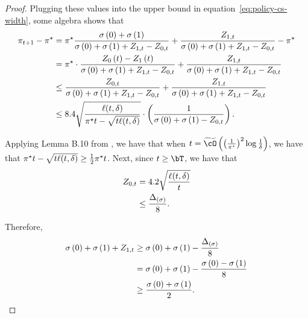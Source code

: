 \begin{proof}
        Plugging these values into the upper bound in equation~\eqref{eq:policy-cs-width}, some algebra shows that
        \begin{align}
            \policy_{\round + 1} - \neymanPolicy 
                &= \neymanPolicy\frac{\stdev[\cidx] + \stdev[\tidx]}
                        {\stdev[\cidx] + \stdev[\tidx] + \confWidth_{\tidx, \round} - \confWidth_{\cidx, \round}}
                    + \frac{\confWidth_{\tidx, \round}}
                        {\stdev[\cidx] + \stdev[\tidx] + \confWidth_{\tidx, \round} - \confWidth_{\cidx, \round}}
                    - \neymanPolicy \\
                &= \neymanPolicy 
                    \cdot \frac{\confWidth[\cidx][\round] - \confWidth[\tidx][\round]}
                        {\stdev[\cidx] + \stdev[\tidx] + \confWidth_{\tidx, \round} - \confWidth_{\cidx, \round}}
                    + \frac{\confWidth_{\tidx, \round}}
                        {\stdev[\cidx] + \stdev[\tidx] + \confWidth_{\tidx, \round} - \confWidth_{\cidx, \round}} \\
                &\leq \frac{\confWidth_{\cidx, \round}}
                        {\stdev[\cidx] + \stdev[\tidx] + \confWidth_{\tidx, \round} - \confWidth_{\cidx, \round}}
                    + \frac{\confWidth_{\tidx, \round}}
                        {\stdev[\cidx] + \stdev[\tidx] + \confWidth_{\tidx, \round} - \confWidth_{\cidx, \round}} \\
                &\leq 8.4 \sqrt{\frac{\ell(\round, \errorProb)}{\neymanPolicy \round - \sqrt{\round \ell(\round, \errorProb)}} } 
                    \cdot \paren{\frac{1}{\stdev[\cidx] + \stdev[\tidx] - \confWidth_{\cidx, \round}}}.
        \end{align}

        Applying Lemma B.10 from \citet{neopane2024logarithmic}, we have that when $\round = \bigTildeO[\paren{\frac{1}{\neymanPolicy}}^2\log \frac{1}{\errorProb}]$, we have that $\neymanPolicy \round - \sqrt{\round \ell(\round, \errorProb)} \geq 
        \frac{1}{2}\neymanPolicy\round$.
        Next, since $\round \geq \exploreTime$, we have that
        \begin{align}
            \confWidth_{\cidx, \round} 
                &= 4.2 \sqrt{\frac{\ell(\round, \errorProb)}{\round}} \\
                &\leq \frac{\stdevGap}{8}.
        \end{align}

        Therefore,
        \begin{align}
            \stdev[\cidx] + \stdev[\tidx] + \confWidth_{\tidx, \round}
                &\geq \stdev[\cidx] + \stdev[\tidx] - \frac{\stdevGap}{8} \\
                &=  \stdev[\cidx] + \stdev[\tidx] - \frac{\stdev[\cidx] - \stdev[\tidx]}{8} \\
                &\geq \frac{\stdev[\cidx] + \stdev[\tidx]}{2}.
        \end{align}


\end{proof}
